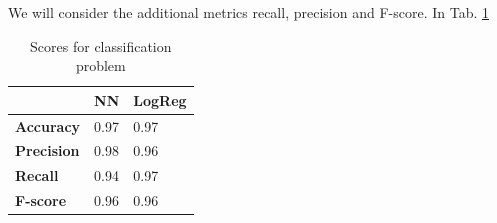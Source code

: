 We will consider the additional metrics recall, precision and F-score. In Tab. \ref{tab:class_score} 



\begin{table}[h]
    \centering
    \begin{tabular}{|m{8em}|m{8.5em}|m{8.5em}|}
    \hline
         & \textbf{NN} & \textbf{LogReg} \\
    \hline
        \textbf{Accuracy} & 0.97 & 0.97\\
    \hline
        \textbf{Precision} & 0.98 & 0.96 \\
    \hline
        \textbf{Recall} & 0.94 & 0.97 \\
    \hline
        \textbf{F-score} & 0.96 & 0.96 \\
    \hline
    \end{tabular}
    \caption{Scores for classification problem}
    \label{tab:class_score}
\end{table}






